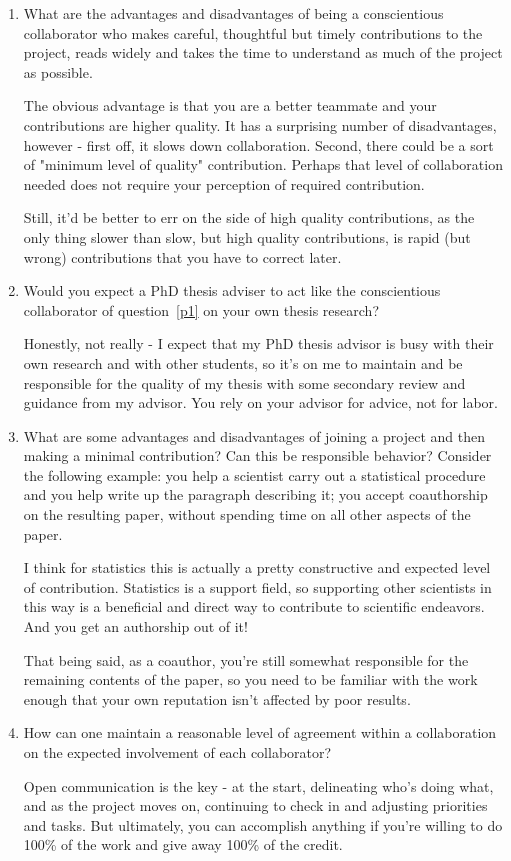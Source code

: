 \documentclass[12pt]{article}
\begin{document}
\begin{enumerate}
 
\item \label{p1} What are the advantages and disadvantages of being a conscientious collaborator who makes careful, thoughtful but timely contributions to the project, reads widely and takes the time to understand as much of the project as possible.

The obvious advantage is that you are a better teammate and your contributions are higher quality. It 
has a surprising number of disadvantages, however - first off, it slows down collaboration. Second, 
there could be a sort of "minimum level of quality" contribution. Perhaps that level of collaboration
needed does not require your perception of required contribution.

Still, it'd be better to err on the side of high quality contributions, as the only thing slower
than slow, but high quality contributions, is rapid (but wrong) contributions that you have to correct later.

\item Would you expect a PhD thesis adviser to act like the conscientious collaborator of question~\ref{p1} on your own thesis research? 

Honestly, not really - I expect that my PhD thesis advisor is busy with their own research and with other students, so it's on me to maintain and be responsible for the quality of my thesis with some secondary review and guidance from my advisor. You rely on your advisor for advice, not for labor.

\item What are some advantages and disadvantages of joining a project and then making a minimal contribution? Can this be responsible behavior? Consider the following example: you help a scientist carry out a statistical procedure and you help write up the paragraph describing it; you accept coauthorship on the resulting paper, without spending time on all other aspects of the paper.

I think for statistics this is actually a pretty constructive and expected level of contribution. Statistics is a support field, so supporting other scientists in this way is a beneficial and direct
way to contribute to scientific endeavors. And you get an authorship out of it! 

That being said, as a coauthor, you're still somewhat responsible for the remaining contents of the paper, so you need to be familiar with the work enough that your own reputation isn't affected
by poor results.

\item How can one maintain a reasonable level of agreement within a collaboration on the expected involvement of each collaborator?

Open communication is the key - at the start, delineating who's doing what, and as the project moves on, continuing to check in and adjusting priorities and tasks. But ultimately, you can 
accomplish anything if you're willing to do 100\% of the work and give away 100\% of the credit.

\end{enumerate}
\end{document}
